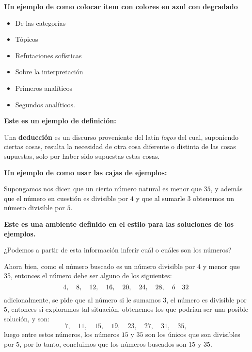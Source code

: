 \textbf{Un ejemplo de como colocar item con colores en azul con degradado}
\begin{itemize}[label=\ptom]
 \item De las categorías
 \item Tópicos 
 \item Refutaciones sofísticas
 \item Sobre la interpretación
 \item Primeros analíticos
 \item Segundos analíticos.
\end{itemize}

\textbf{Este es un ejemplo de definición:}
\begin{defi}[][def:01:01]
Una \textbf{deducción} es un discurso proveniente del latín \textit{logos} del cual, suponiendo ciertas cosas, resulta la necesidad de otra cosa diferente o distinta de las cosas supuestas, solo por haber sido supuestas estas cosas.
\end{defi}


\textbf{Un ejemplo de como usar las cajas de ejemplos:}
\begin{ejem}[][ejem:01:01] Supongamos nos dicen que un cierto número natural es menor que $35$, y además que el número en cuestión es divisible por $4$ y que al sumarle $3$ obtenemos un número divisible por $5$.
\end{ejem}


\textbf{Este es una ambiente definido en el estilo para las soluciones de los ejemplos.}

\begin{soln} ¿Podemos a partir de esta información inferir cuál o cuáles son los números?

\medskip

Ahora bien, como el número buscado es un número divisible por 4 y menor que 35, entonces el número debe ser alguno de los siguientes:
\[4,\quad 8,\quad 12, \quad 16, \quad 20, \quad 24, \quad 28, \quad \hbox{ó}\quad 32\]
adicionalmente, se pide que al número si le sumamos $3$, el número es divisible por $5$, entonces si exploramos tal situación, obtenemos los que podrían ser una posible solución, y son:
\[7,\quad 11,\quad 15, \quad 19, \quad 23, \quad 27, \quad 31, \quad 35,\]
luego entre estos números, los números $15$ y  $35$ son los únicos que son divisibles por $5$, por lo tanto, concluimos que los números buscados son $15$ y $35$.
\end{soln}

